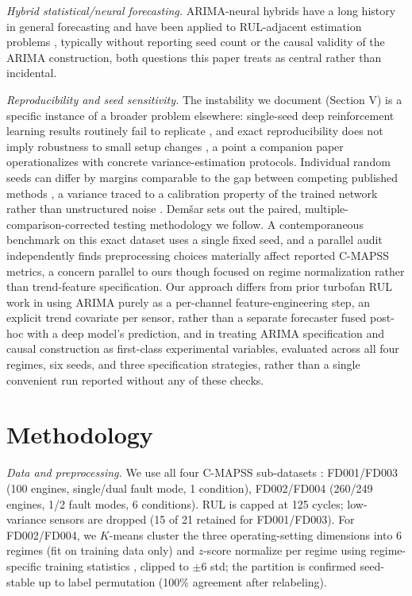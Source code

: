 \documentclass[conference]{IEEEtran}
\begin{document}
\emph{Hybrid statistical/neural forecasting.} ARIMA-neural hybrids have a long history in general forecasting \cite{zhang2003} and have been applied to RUL-adjacent estimation problems \cite{arimalstmvalve2022}, typically without reporting seed count or the causal validity of the ARIMA construction, both questions this paper treats as central rather than incidental.

\emph{Reproducibility and seed sensitivity.} The instability we document (Section V) is a specific instance of a broader problem elsewhere: single-seed deep reinforcement learning results routinely fail to replicate \cite{henderson2018}, and exact reproducibility does not imply robustness to small setup changes \cite{bouthillier2019}, a point a companion paper \cite{bouthillier2021} operationalizes with concrete variance-estimation protocols. Individual random seeds can differ by margins comparable to the gap between competing published methods \cite{picard2021}, a variance traced to a calibration property of the trained network rather than unstructured noise \cite{jordan2024}. Demšar \cite{demsar2006} sets out the paired, multiple-comparison-corrected testing methodology we follow. A contemporaneous benchmark on this exact dataset \cite{goel2026} uses a single fixed seed, and a parallel audit \cite{gupta2026} independently finds preprocessing choices materially affect reported C-MAPSS metrics, a concern parallel to ours though focused on regime normalization rather than trend-feature specification. Our approach differs from prior turbofan RUL work in using ARIMA purely as a per-channel feature-engineering step, an explicit trend covariate per sensor, rather than a separate forecaster fused post-hoc with a deep model's prediction, and in treating ARIMA specification and causal construction as first-class experimental variables, evaluated across all four regimes, six seeds, and three specification strategies, rather than a single convenient run reported without any of these checks.

\section{Methodology}
\emph{Data and preprocessing.} We use all four C-MAPSS sub-datasets \cite{saxena2008}: FD001/FD003 (100 engines, single/dual fault mode, 1 condition), FD002/FD004 (260/249 engines, 1/2 fault modes, 6 conditions). RUL is capped at 125 cycles; low-variance sensors are dropped (15 of 21 retained for FD001/FD003). For FD002/FD004, we $K$-means cluster the three operating-setting dimensions into 6 regimes (fit on training data only) and $z$-score normalize per regime using regime-specific training statistics \cite{regimenorm2018}, clipped to $\pm 6$ std; the partition is confirmed seed-stable up to label permutation (100\% agreement after relabeling).
\end{document}
